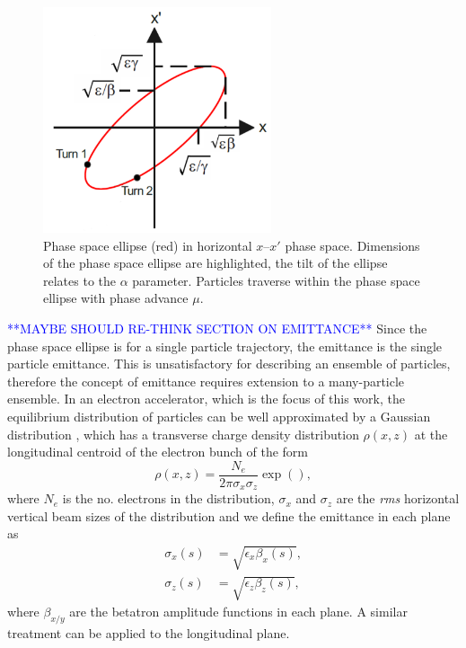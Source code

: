 \documentclass[../main.tex]{subfiles}
\begin{document}
\begin{figure}[!h]
\centering
\includegraphics[width=0.6\textwidth]{Figures/Energy_Recovery_Linac_Design/phase_space_fixed.pdf}
\caption{Phase space ellipse (red) in horizontal $x$--$x'$ phase space. Dimensions of the phase space ellipse are highlighted, the tilt of the ellipse relates to the $\alpha$ parameter. Particles traverse within the phase space ellipse with phase advance $\mu$.}
\label{fig:phase_space_diagram}
\end{figure}

\textcolor{blue}{**MAYBE SHOULD RE-THINK SECTION ON EMITTANCE**}
Since the phase space ellipse is for a single particle trajectory, the emittance is the single particle emittance. This is unsatisfactory for describing an ensemble of particles, therefore the concept of emittance requires extension to a many-particle ensemble. In an electron accelerator, which is the focus of this work, the equilibrium distribution of particles can be well approximated by a Gaussian distribution \cite{wille2000physics}, which has a transverse charge density distribution $\rho\left(x,z\right)$ at the longitudinal centroid of the electron bunch of the form
\begin{equation}
\rho\left(x,z\right) = \frac{N_{e}}{2\pi\sigma_{x}\sigma_{z}}\exp\left(\right),
\label{eq:Gaussian_transverse_charge_distribution}    
\end{equation}
where $N_{e}$ is the no. electrons in the distribution, $\sigma_{x}$ and $\sigma_{z}$ are the \textit{rms} horizontal vertical beam sizes of the distribution and we define the emittance in each plane as
\begin{align}
\sigma_{x}\left(s\right) &= \sqrt{\epsilon_{x}\beta_{x}\left(s\right)}, 
\label{eq:horizontal_emittance} \\
\sigma_{z}\left(s\right) &= \sqrt{\epsilon_{z}\beta_{z}\left(s\right)},
\label{eq:vertical_emittance}
\end{align}
where $\beta_{x/y}$ are the betatron amplitude functions in each plane. A similar treatment can be applied to the longitudinal plane.
\end{document}
